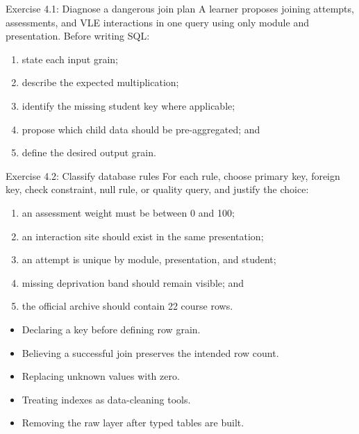 \begin{exercisebox}{Exercise 4.1: Diagnose a dangerous join plan}
A learner proposes joining attempts, assessments, and VLE interactions in one
query using only module and presentation. Before writing SQL:
\begin{enumerate}
  \item state each input grain;
  \item describe the expected multiplication;
  \item identify the missing student key where applicable;
  \item propose which child data should be pre-aggregated; and
  \item define the desired output grain.
\end{enumerate}
\end{exercisebox}

\begin{exercisebox}{Exercise 4.2: Classify database rules}
For each rule, choose primary key, foreign key, check constraint, null rule, or
quality query, and justify the choice:
\begin{enumerate}
  \item an assessment weight must be between 0 and 100;
  \item an interaction site should exist in the same presentation;
  \item an attempt is unique by module, presentation, and student;
  \item missing deprivation band should remain visible; and
  \item the official archive should contain 22 course rows.
\end{enumerate}
\end{exercisebox}

\begin{commonmistakes}
\begin{itemize}
  \item Declaring a key before defining row grain.
  \item Believing a successful join preserves the intended row count.
  \item Replacing unknown values with zero.
  \item Treating indexes as data-cleaning tools.
  \item Removing the raw layer after typed tables are built.
\end{itemize}
\end{commonmistakes}

